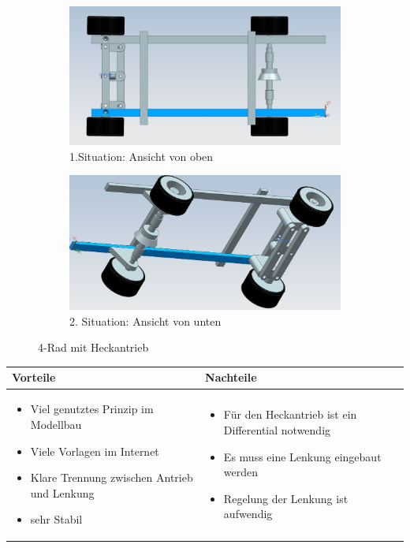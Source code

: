 \begin{figure} [hbp]
	\centering
	\begin{subfigure}[b]{0.4\textwidth}
		\includegraphics[width=\textwidth]{fig/4Rad-1.JPG}
		\caption{1.Situation: Ansicht von oben}
	\end{subfigure}
	\hfill
	\begin{subfigure}[b]{0.36\textwidth}
		\includegraphics[width=\textwidth]{fig/4Rad-2.JPG}
		\caption{2. Situation: Ansicht von unten}
\end{subfigure}
	\caption{4-Rad mit Heckantrieb}\label{fig:animals}
\end{figure}

\begin{table}[h]
\begin{tabular}{p{} | p{}}


 \textbf{Vorteile} & \textbf{Nachteile} \\ \hline
	 
\begin{itemize}
\item Viel genutztes Prinzip im Modellbau
\item Viele Vorlagen im Internet
\item Klare Trennung zwischen Antrieb und Lenkung
\item sehr Stabil
\end{itemize}

 
 &
 
\begin{itemize}
\item Für den Heckantrieb ist ein Differential notwendig
\item Es muss eine Lenkung eingebaut werden 
\item Regelung der Lenkung ist aufwendig
\end{itemize}

\end{tabular}
\end{table}

